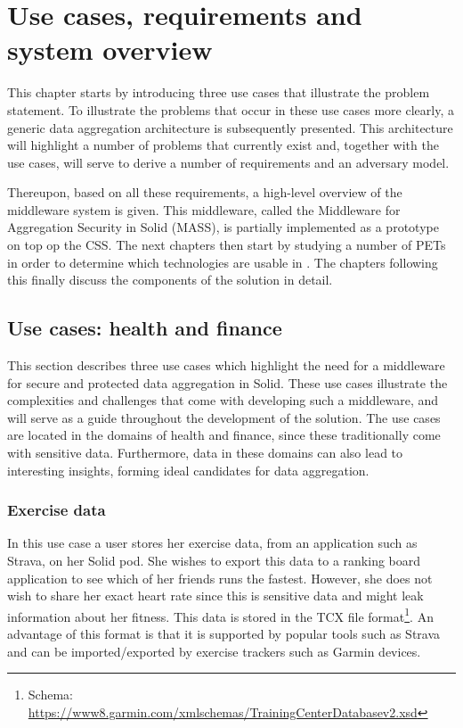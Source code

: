 \chapter{Use cases, requirements and system overview}
\label{cha:solution-overview}
This chapter starts by introducing three use cases that illustrate the problem statement. To illustrate the problems that occur in these use cases more clearly, a generic data aggregation architecture is subsequently presented. This architecture will highlight a number of problems that currently exist and, together with the use cases, will serve to derive a number of 
requirements and an adversary model.

Thereupon, based on all these requirements, a high-level overview of the middleware system is given. This middleware, called the Middleware for Aggregation Security in Solid (MASS), is partially implemented as a prototype on top op the \acrlong{CSS}. The next chapters then start by studying a number of \gls{PETs} in order to determine which technologies are usable in \middleware{}. The chapters following this finally discuss the components of the solution in detail.

\section{Use cases: health and finance}
\label{sec:usecases}
This section describes three use cases which highlight the need for a middleware for secure and protected data aggregation in Solid. These use cases illustrate the complexities and challenges that come with developing such a middleware, and will serve as a guide throughout the development of the solution. The use cases are located in the domains of health and finance, since these traditionally come with sensitive data. Furthermore, data in these domains can also lead to interesting insights, forming ideal candidates for data aggregation.

\subsection{Exercise data}
\label{usecase:ex-data}
In this use case a user stores her exercise data, from an application such as Strava, on her Solid pod. She wishes to export this data to a ranking board application to see which of her friends runs the fastest. However, she does not wish to share her exact heart rate since this is sensitive data and might leak information about her fitness. This data is stored in the TCX file format\footnote{Schema: \url{https://www8.garmin.com/xmlschemas/TrainingCenterDatabasev2.xsd}}. An advantage of this format is that it is supported by popular tools such as Strava and can be imported/exported by exercise trackers such as Garmin devices.

